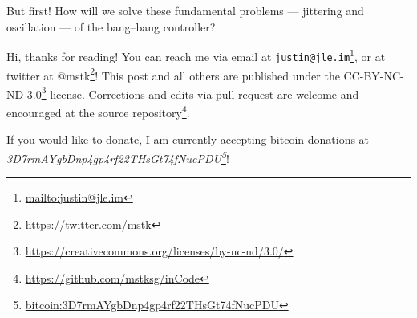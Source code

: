 \documentclass[]{article}
\renewcommand{\href}[2]{#2\footnote{\url{#1}}}
\begin{document}
But first! How will we solve these fundamental problems --- jittering and
oscillation --- of the bang--bang controller?

Hi, thanks for reading! You can reach me via email at
\href{mailto:justin@jle.im}{\nolinkurl{justin@jle.im}}, or at twitter at
\href{https://twitter.com/mstk}{@mstk}! This post and all others are published
under the \href{https://creativecommons.org/licenses/by-nc-nd/3.0/}{CC-BY-NC-ND
3.0} license. Corrections and edits via pull request are welcome and encouraged
at \href{https://github.com/mstksg/inCode}{the source repository}.

If you would like to donate, I am currently accepting bitcoin donations at
\emph{\href{bitcoin:3D7rmAYgbDnp4gp4rf22THsGt74fNucPDU}{3D7rmAYgbDnp4gp4rf22THsGt74fNucPDU}}!
\end{document}
